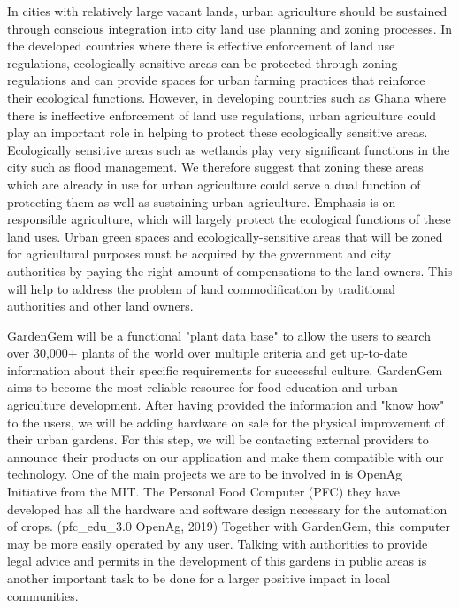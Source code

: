 In cities with relatively large vacant lands, urban agriculture should be sustained through conscious integration into city land use planning and zoning processes. In the developed countries where there is effective enforcement of land use regulations, ecologically-sensitive areas can be protected through zoning regulations and can provide spaces for urban farming practices that reinforce their ecological functions. However, in developing countries such as Ghana where there is ineffective enforcement of land use regulations, urban agriculture could play an important role in helping to protect these ecologically sensitive areas. Ecologically sensitive areas such as wetlands play very significant functions in the city such as flood management. We therefore suggest that zoning these areas which are already in use for urban agriculture could serve a dual function of protecting them as well as sustaining urban agriculture. Emphasis is on responsible agriculture, which will largely protect the ecological functions of these land uses. Urban green spaces and ecologically-sensitive areas that will be zoned for agricultural purposes must be acquired by the government and city authorities by paying the right amount of compensations to the land owners. This will help to address the problem of land commodification by traditional authorities and other land owners.

GardenGem will be a functional "plant data base" to allow the users to search over 30,000+ plants of the world over multiple criteria and get up-to-date information about their specific requirements for successful culture. GardenGem aims to become the most reliable resource for food education and urban agriculture development.
After having provided the information and "know how" to the users, we will be adding hardware on sale for the physical improvement of their urban gardens. For this step, we will be contacting external providers to announce their products on our application and make them compatible with our technology. One of the main projects we are to be involved in is OpenAg Initiative from the MIT. The Personal Food Computer (PFC) they have developed has all the hardware and software design necessary for the automation of crops. (pfc\_edu\_3.0 OpenAg, 2019) Together with GardenGem, this computer may be more easily operated by any user. Talking with authorities to provide legal advice and permits in the development of this gardens in public areas is another important task to be done for a larger positive impact in local communities.



